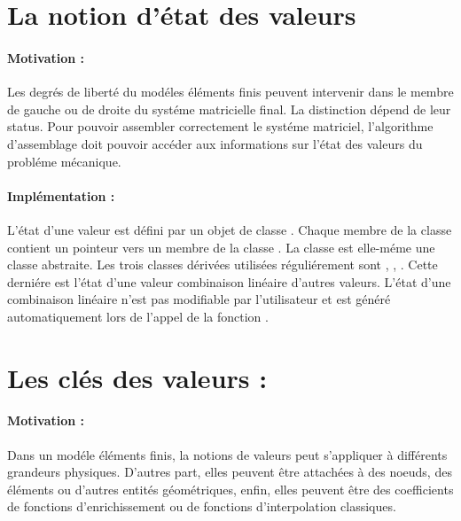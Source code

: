 \section{La notion d'\'etat des valeurs}\label{section_xStateOfValue}

\paragraph*{Motivation :}
Les degr\'es de libert\'e du mod\'eles \'el\'ements finis peuvent intervenir
dans le membre de gauche ou de droite du syst\'eme matricielle final.
La distinction d\'epend de leur status. Pour pouvoir assembler
correctement le syst\'eme matriciel, l'algorithme d'assemblage doit
pouvoir acc\'eder aux informations sur l'\'etat des valeurs du probl\'eme
m\'ecanique.

\paragraph*{Impl\'ementation :}
L'\'etat d'une valeur est d\'efini par un objet de  classe
. Chaque membre de la classe  
contient un pointeur vers un membre de la classe
. La classe  est
elle-m\'eme une classe abstraite. Les trois classes d\'eriv\'ees utilis\'ees
r\'eguli\'erement sont   ,
,
. Cette derni\'ere est l'\'etat
d'une valeur combinaison lin\'eaire d'autres valeurs. L'\'etat d'une
combinaison lin\'eaire n'est pas modifiable par l'utilisateur et est
g\'en\'er\'e automatiquement lors de l'appel de la fonction
.




\section{Les cl\'es des valeurs : }\label{section_xValkey}

\paragraph*{Motivation :}

Dans un mod\'ele \'el\'ements finis, la notions de valeurs peut
s'appliquer \`a diff\'erents grandeurs physiques. D'autres part, elles
peuvent \^etre attach\'ees \`a des noeuds, des \'el\'ements ou d'autres
entit\'es g\'eom\'etriques, enfin, elles peuvent \^etre des coefficients de
fonctions d'enrichissement  ou de  fonctions d'interpolation
classiques.

